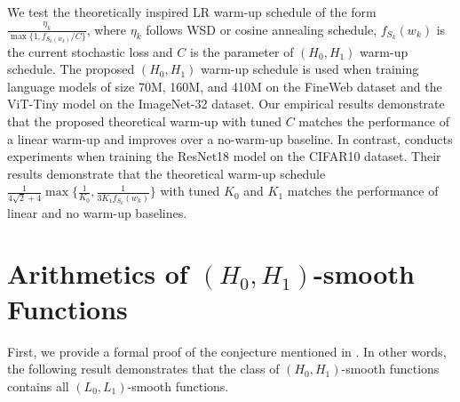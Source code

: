 \documentclass[a4paper,11pt]{article}
\newcommand{\1}{\mathbbm{1}}
\theoremstyle{plain}
\begin{document}
We test the theoretically inspired LR warm-up schedule of the form $\frac{\eta_k}{\max\{1, f_{S_k(w_k)}/C\}}$, where  $\eta_k$ follows WSD or cosine annealing schedule, $f_{S_k}(w_k)$ is the current stochastic loss and $C$ is the parameter of $(H_0, H_1)$ warm-up schedule. The proposed $(H_0, H_1)$ warm-up schedule is used when training language models of size 70M, 160M, and 410M on the FineWeb dataset and the ViT-Tiny model on the ImageNet-32 dataset. Our empirical results demonstrate that the proposed theoretical warm-up with tuned $C$ matches the performance of a linear warm-up and improves over a no-warm-up baseline. In contrast, \citet{liu2025theoretical} conducts experiments when training the ResNet18 model on the CIFAR10 dataset. Their results demonstrate that the theoretical warm-up schedule $\frac{1}{4\sqrt{2}+4}\max\{\frac{1}{K_0}, \frac{1}{3K_1f_{S_k}(w_k)}\}$ with tuned $K_0$ and $K_1$ matches the performance of linear and no warm-up baselines.


\section{Arithmetics of $(H_0,H_1)$-smooth Functions }\label{sec:more_general_class}

First, we provide a formal proof of the conjecture mentioned in . In other words, the following result demonstrates that the class of $(H_0, H_1)$-smooth functions contains all $(L_0, L_1)$-smooth functions.
\end{document}
